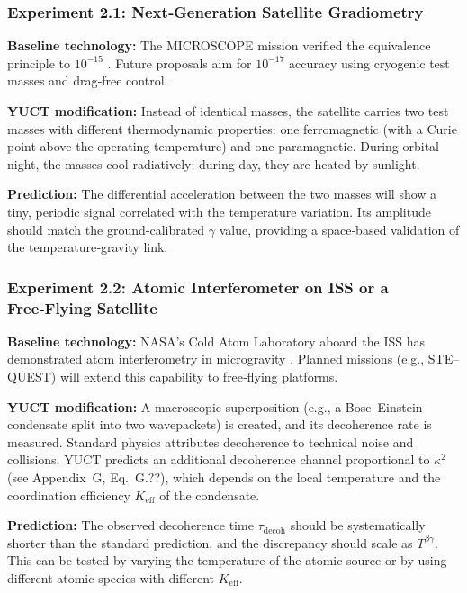 \documentclass[12pt]{article}
\theoremstyle{remark}
\newcommand{\Keff}{K_{\mathrm{eff}}}
\begin{document}
	\subsubsection{Experiment 2.1: Next‑Generation Satellite Gradiometry}
	
	\textbf{Baseline technology:} The MICROSCOPE mission verified the equivalence principle to \(10^{-15}\)
	\cite{Touboul2022}.  
	Future proposals aim for \(10^{-17}\) accuracy using cryogenic test masses and drag‑free control.
	
	\textbf{YUCT modification:} Instead of identical masses, the satellite carries two test masses with different
	thermodynamic properties: one ferromagnetic (with a Curie point above the operating temperature) and one
	paramagnetic.  
	During orbital night, the masses cool radiatively; during day, they are heated by sunlight.
	
	\textbf{Prediction:} The differential acceleration between the two masses will show a tiny, periodic signal
	correlated with the temperature variation.  
	Its amplitude should match the ground‑calibrated \(\gamma\) value, providing a space‑based validation of the
	temperature‑gravity link.
	
	\subsubsection{Experiment 2.2: Atomic Interferometer on ISS or a Free‑Flying Satellite}
	
	\textbf{Baseline technology:} NASA’s Cold Atom Laboratory aboard the ISS has demonstrated atom interferometry in
	microgravity \cite{Aveline2020}.  
	Planned missions (e.g., STE–QUEST) will extend this capability to free‑flying platforms.
	
	\textbf{YUCT modification:} A macroscopic superposition (e.g., a Bose–Einstein condensate split into two
	wavepackets) is created, and its decoherence rate is measured.  
	Standard physics attributes decoherence to technical noise and collisions. YUCT predicts an additional
	decoherence channel proportional to \(\kappa^2\) (see Appendix~G, Eq.~G.??), which depends on the local
	temperature and the coordination efficiency \(\Keff\) of the condensate.
	
	\textbf{Prediction:} The observed decoherence time \(\tau_{\mathrm{decoh}}\) should be systematically shorter
	than the standard prediction, and the discrepancy should scale as \(T^{\beta\gamma}\).  
	This can be tested by varying the temperature of the atomic source or by using different atomic species with
	different \(\Keff\).
	
\end{document}
